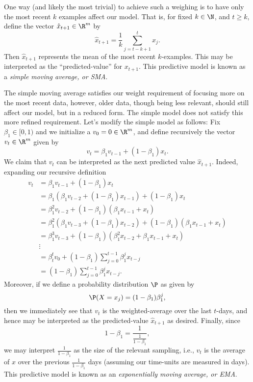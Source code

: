 One way (and likely the most trivial) to achieve such a weighing is to have only the most recent $k$ examples affect our model.  That is, for fixed $k\in\N$, and $t\geq k$, define the vector $\hat{x}_{t+1}\in\R^m$ by
$$\hat{x}_{t+1}=\frac{1}{k}\sum_{j=t-k+1}^tx_j.$$
Then $\hat{x}_{t+1}$ represents the mean of the most recent $k$-examples.  This may be interpreted as the ``predicted-value'' for $x_{t+1}$.  This predictive model is known as a \textit{simple moving average, or SMA}.

The simple moving average satisfies our weight requirement of focusing more on the most recent data, however, older data, though being less relevant, should still affect our model, but in a reduced form.  The simple model does not satisfy this more refined requirement.  Let's modify the simple model as follows:  Fix $\beta_1\in[0,1)$ and we initialize a $v_0=0\in\R^m$, and define recursively the vector $v_t\in\R^m$ given by
$$v_t=\beta_1v_{t-1}+(1-\beta_1)x_t.$$
We claim that $v_t$ can be interpreted as the next predicted value $\hat{x}_{t+1}$.  Indeed, expanding our recursive definition
\begin{align*}
	v_t&=\beta_1v_{t-1}+(1-\beta_1)x_t\\
	&=\beta_1(\beta_1v_{t-2}+(1-\beta_1)x_{t-1})+(1-\beta_1)x_t\\
	&=\beta_1^2v_{t-2}+(1-\beta_1)(\beta_1x_{t-1}+x_t)\\
	&=\beta_1^2(\beta_1v_{t-3}+(1-\beta_1)x_{t-2})+(1-\beta_1)(\beta_1x_{t-1}+x_t)\\
	&=\beta_1^3v_{t-3}+(1-\beta_1)(\beta_1^2x_{t-2}+\beta_1x_{t-1}+x_t)\\
	&\vdots\\
	&=\beta_t^tv_0+(1-\beta_1)\sum_{j=0}^{t-1}\beta_1^jx_{t-j}\\
	&=(1-\beta_1)\sum_{j=0}^{t-1}\beta_1^jx_{t-j}.
\end{align*}
Moreover, if we define a probability distribution $\P$ as given by
$$\P(X=x_j)=(1-\beta_1)\beta_1^j,$$
then we immediately see that $v_t$ is the weighted-average over the last $t$-days, and hence may be interpreted as the predicted-value $\hat{x}_{t+1}$ as desired.  Finally, since
$$1-\beta_1=\frac{1}{\frac{1}{1-\beta_1}},$$
we may interpret $\frac{1}{1-\beta_1}$ as the size of the relevant sampling, i.e., $v_t$ is the average of $x$ over the previous $\frac{1}{1-\beta_1}$ days (assuming our time-units are measured in days).  This predictive model is known as an \textit{exponentially moving average, or EMA}.

